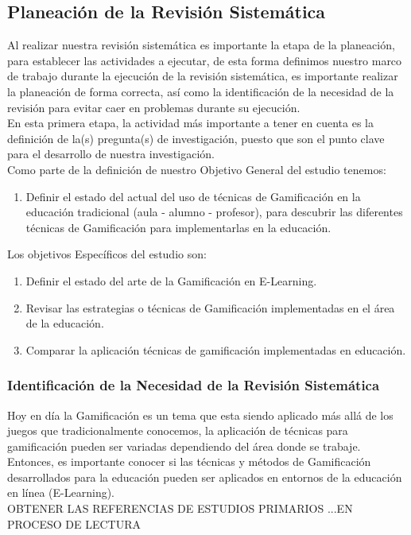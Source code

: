 \documentclass{report}
\begin{document}
    \subsection{Planeación de la Revisión Sistemática}
     Al realizar nuestra revisión sistemática es importante la etapa de la planeación, para establecer las actividades a ejecutar, de esta forma definimos nuestro marco de trabajo durante la ejecución de la revisión sistemática, es importante realizar la planeación de forma correcta, así como la identificación de la necesidad de la revisión para evitar caer en problemas durante su ejecución.\\
    	En esta primera etapa, la actividad más importante a tener en cuenta es la definición de la(s) pregunta(s) de investigación, puesto que son el punto clave para el desarrollo de nuestra investigación.\\
    	Como parte de la definición de nuestro Objetivo General del estudio tenemos:
        \begin{enumerate}
        	\item Definir el estado del actual del uso de técnicas de Gamificación en la educación tradicional (aula - alumno - profesor), para descubrir las diferentes técnicas de Gamificación para implementarlas en la educación.
        \end{enumerate}
Los objetivos Específicos del estudio son:
        \begin{enumerate}
        	\item Definir el estado del arte de la Gamificación en E-Learning.
        	\item Revisar las estrategias o técnicas de Gamificación implementadas en el área de la educación.
        	\item Comparar la aplicación técnicas de gamificación implementadas en educación.
        \end{enumerate}

    	    \subsubsection{Identificación de la Necesidad de la Revisión Sistemática} \label{needs}
    	    
            Hoy en día la Gamificación es un tema que esta siendo aplicado más allá de los juegos que tradicionalmente conocemos, la aplicación de técnicas para gamificación pueden ser variadas dependiendo del área donde se trabaje. Entonces, es importante conocer si las técnicas y métodos de Gamificación desarrollados para la educación pueden ser aplicados en entornos de la educación en línea (E-Learning). \\
           OBTENER LAS REFERENCIAS DE ESTUDIOS PRIMARIOS ...EN PROCESO DE LECTURA
            
\end{document}
